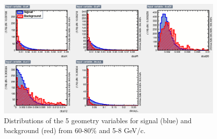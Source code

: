 \begin{figure}[htbp]
\centering
\includegraphics[keepaspectratio,width=1.0\textwidth]{figure/Run14_D0HFT/variables_id_c1_60_80.eps}
\caption{Distributions of the 5 geometry variables for signal (blue) and background (red) from 60-80\% and 5-8 GeV/c.}
\label{fig:variables_60_80}
\end{figure}

